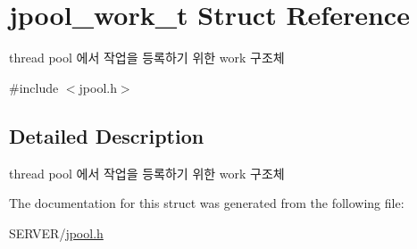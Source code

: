 \hypertarget{structjpool__work__t}{\section{jpool\-\_\-work\-\_\-t Struct Reference}
\label{structjpool__work__t}
}


thread pool 에서 작업을 등록하기 위한 work 구조체  




{\ttfamily \#include $<$jpool.\-h$>$}



\subsection{Detailed Description}
thread pool 에서 작업을 등록하기 위한 work 구조체 

The documentation for this struct was generated from the following file\-:\begin{DoxyCompactItemize}
\item 
S\-E\-R\-V\-E\-R/\hyperlink{jpool_8h}{jpool.\-h}\end{DoxyCompactItemize}
